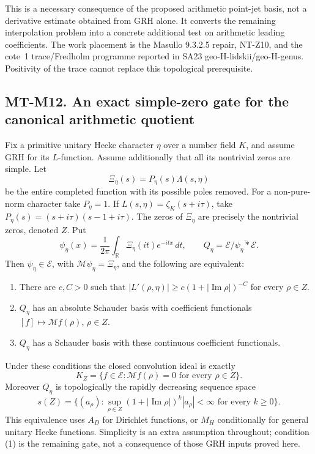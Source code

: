 \documentclass[11pt,a4paper]{article}
\begin{document}
This is a necessary consequence of the proposed arithmetic
point-jet basis, not a derivative estimate obtained from GRH
alone. It converts the remaining interpolation problem into
a concrete additional test on arithmetic leading coefficients.
The work placement is the Masullo 9.3.2.5 repair, NT-Z10,
and the cote~1 trace/Fredholm programme reported in SA23
geo-H-lidskii/geo-H-genus. Positivity of the trace cannot
replace this topological prerequisite.

\subsection*{MT-M12. An exact simple-zero gate for the canonical arithmetic quotient}
Fix a primitive unitary Hecke character $\eta$ over a number field
$K$, and assume GRH for its $L$-function. Assume additionally that
all its nontrivial zeros are simple. Let
\[
 \Xi_\eta(s)=P_\eta(s)\Lambda(s,\eta)
\]
be the entire completed function with its possible poles removed.
For a non-pure-norm character take $P_\eta=1$. If
$L(s,\eta)=\zeta_K(s+i\tau)$, take
$P_\eta(s)=(s+i\tau)(s-1+i\tau)$.
The zeros of $\Xi_\eta$ are precisely the nontrivial zeros, denoted
$Z$. Put
\[
 \psi_\eta(x)=\frac1{2\pi}\int_{\mathbb R}\Xi_\eta(it)e^{-itx}\,dt,
 \qquad Q_\eta=\mathcal E/\overline{\psi_\eta*\mathcal E}.
\]
Then $\psi_\eta\in\mathcal E$, with
$\mathcal M\psi_\eta=\Xi_\eta$, and the following are equivalent:
\begin{enumerate}
\item There are $c,C>0$ such that
$|L'(\rho,\eta)|\ge c(1+|\operatorname{Im}\rho|)^{-C}$ for
every $\rho\in Z$.
\item $Q_\eta$ has an absolute Schauder basis with coefficient
functionals $[f]\mapsto\mathcal Mf(\rho)$, $\rho\in Z$.
\item $Q_\eta$ has a Schauder basis with these continuous
coefficient functionals.
\end{enumerate}
Under these conditions the closed convolution ideal is exactly
\[
 K_Z=\{f\in\mathcal E:\mathcal Mf(\rho)=0
                              \text{ for every }\rho\in Z\}. \tag{MT-M12a}
\]
Moreover $Q_\eta$ is topologically the rapidly decreasing sequence
space
\[
 s(Z)=\{(a_\rho):\sup_{\rho\in Z}
       (1+|\operatorname{Im}\rho|)^k|a_\rho|<\infty
                                  \text{ for every }k\ge0\}. \tag{MT-M12b}
\]
This equivalence uses $A_D$ for Dirichlet functions, or $M_H$
conditionally for general unitary Hecke functions. Simplicity is
an extra assumption throughout; condition (1) is the remaining
gate, not a consequence of those GRH inputs proved here.
\end{document}
